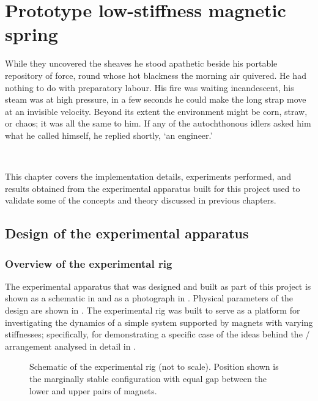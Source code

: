 \documentclass[11pt,a4paper]{memoir}
\begin{document}
\chapter{Prototype low-stiffness magnetic spring}

\epigraph{While they uncovered the sheaves he stood apathetic beside his
portable repository of force, round whose hot blackness the morning
air quivered.  He had nothing to do with preparatory labour.  His
fire was waiting incandescent, his steam was at high pressure, in
a few seconds he could make the long strap move at an invisible
velocity.  Beyond its extent the environment might be corn, straw,
or chaos; it was all the same to him.  If any of the autochthonous
idlers asked him what he called himself, he replied shortly, `an
engineer.'}{\\\textcite{hardy1981-tess}}

\noindent
This chapter covers the implementation details, experiments performed, and results obtained from the experimental apparatus built for this project used to validate some of the concepts and theory discussed in previous chapters.

\section{Design of the experimental apparatus}

\subsection{Overview of the experimental rig}

The experimental apparatus that was designed and built as part of this project
is shown as a schematic in  and as a photograph in
. Physical parameters of the design are shown in
. The experimental rig was built to serve as a platform for
investigating the dynamics of a simple system supported by magnets with
varying stiffnesses; specifically, for demonstrating a specific case of
the ideas behind the \qzs/ arrangement analysed in detail in .

\begin{figure}
  \begin{wide}
  \end{wide}
  \caption[Schematic of the experimental rig.]{
    Schematic of the experimental rig (not to scale). Position shown is
    the marginally stable configuration with equal gap between the lower
    and upper pairs of magnets.}
\end{figure}
\end{document}

